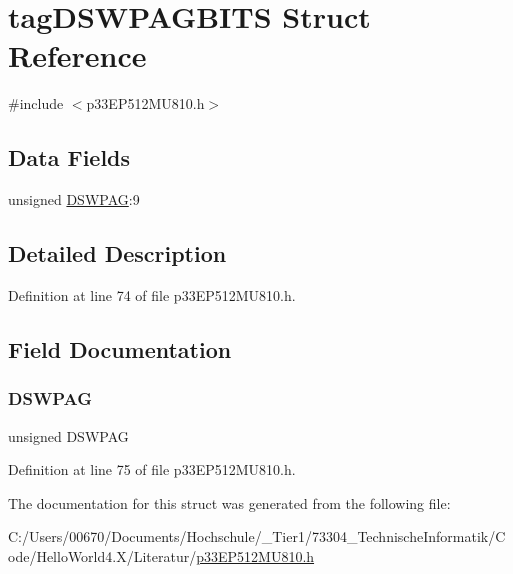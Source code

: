 \hypertarget{structtag_d_s_w_p_a_g_b_i_t_s}{}\section{tag\+D\+S\+W\+P\+A\+G\+B\+I\+TS Struct Reference}
\label{structtag_d_s_w_p_a_g_b_i_t_s}


{\ttfamily \#include $<$p33\+E\+P512\+M\+U810.\+h$>$}

\subsection*{Data Fields}
\begin{DoxyCompactItemize}
\item 
unsigned \hyperlink{structtag_d_s_w_p_a_g_b_i_t_s_a3bb92d39084a37fd7cf7c826c349989d}{D\+S\+W\+P\+AG}\+:9
\end{DoxyCompactItemize}


\subsection{Detailed Description}


Definition at line 74 of file p33\+E\+P512\+M\+U810.\+h.



\subsection{Field Documentation}
\mbox{\label{structtag_d_s_w_p_a_g_b_i_t_s_a3bb92d39084a37fd7cf7c826c349989d}} 
\subsubsection{\texorpdfstring{D\+S\+W\+P\+AG}{DSWPAG}}
{\footnotesize\ttfamily unsigned D\+S\+W\+P\+AG}



Definition at line 75 of file p33\+E\+P512\+M\+U810.\+h.



The documentation for this struct was generated from the following file\+:\begin{DoxyCompactItemize}
\item 
C\+:/\+Users/00670/\+Documents/\+Hochschule/\+\_\+\+Tier1/73304\+\_\+\+Technische\+Informatik/\+Code/\+Hello\+World4.\+X/\+Literatur/\hyperlink{p33_e_p512_m_u810_8h}{p33\+E\+P512\+M\+U810.\+h}\end{DoxyCompactItemize}
